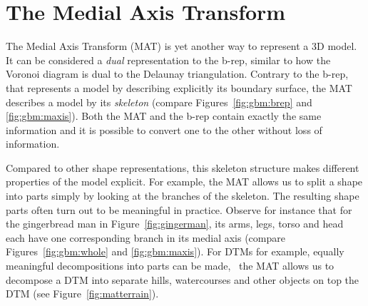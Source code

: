 
\setchapterpreamble[u]{\margintoc}

\graphicspath{{mat/}}
\renewcommand*{\thelesson}{4.1}

\chapter{The Medial Axis Transform}%
\label{chap:mat}

The Medial Axis Transform (MAT) is yet another way to represent a 3D model.
It can be considered a \emph{dual} representation to the b-rep, similar to how the Voronoi diagram is dual to the Delaunay triangulation. 
Contrary to the b-rep, that represents a model by describing explicitly its boundary surface, the MAT describes a model by its \emph{skeleton} (compare Figures~\ref{fig:gbm:brep} and \ref{fig:gbm:maxis}).
Both the MAT and the b-rep contain exactly the same information and it is possible to convert one to the other without loss of information.

Compared to other shape representations, this skeleton structure makes different properties of the model explicit.
For example, the MAT allows us to split a shape into parts simply by looking at the branches of the skeleton. 
The resulting shape parts often turn out to be meaningful in practice. 
Observe for instance that for the gingerbread man in Figure~\ref{fig:gingerman}, its arms, legs, torso and head each have one corresponding branch in its medial axis (compare Figures~\ref{fig:gbm:whole} and \ref{fig:gbm:maxis}).
For DTMs for example, equally meaningful decompositions into parts can be made, \eg\ the MAT allows us to decompose a DTM into separate hills, watercourses and other objects on top the DTM (see Figure~\ref{fig:matterrain}).

